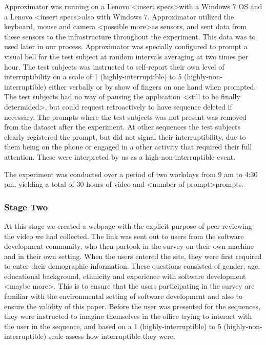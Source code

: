 \documentclass{sigchi}
\begin{document}
Approximator was running on a Lenovo \textless insert specs\textgreater with a Windows 7 OS and a Lenovo \textless insert specs\textgreater also with Windows 7.
Approximator utilized the keyboard, mouse and camera \textless possible more\textgreater as sensors, and sent data from these sensors to the infrastructure throughout the experiment.
This data was to used later in our process.
Approximator was specially configured to prompt a visual bell for the test subject at random intervals averaging at two times per hour.
The test subjects was instructed to self-report their own level of interruptibility on a scale of 1 (highly-interruptible) to 5 (highly-non-interruptible) either verbally or by show of fingers on one hand when prompted.
The test subjects had no way of pausing the application \textless still to be finally determided\textgreater, but could request retroactively to have sequence deleted if necessary.
The prompts where the test subjects was not present was removed from the dataset after the experiment.
At other sequences the test subjects clearly registered the prompt, but did not signal their interruptibility, due to them being on the phone or engaged in a other activity that required their full attention. These were interpreted by us as a high-non-interruptible event.

The experiment was conducted over a period of two workdays from 9 am to 4:30 pm, yielding a total of 30 hours of video and \textless number of prompt\textgreater prompts.

\subsubsection{Stage Two}
At this stage we created a webpage with the explicit purpose of peer reviewing the video we had collected. The link was sent out to users from the software development community, who then partook in the survey on their own machine and in their own setting.
When the users entered the site, they were first required to enter their demographic information.
These questions consisted of gender, age, educational background, ethnicity and experience with software development \textless maybe more\textgreater.
This is to ensure that the users participating in the survey are familiar with the environmental setting of software development and also to ensure the validity of this paper.
Before the user was presented for the sequences, they were instructed to imagine themselves in the office trying to interact with the user in the sequence, and based on a 1 (highly-interruptible) to 5 (highly-non-interruptible) scale assess how interruptible they were.
\end{document}

